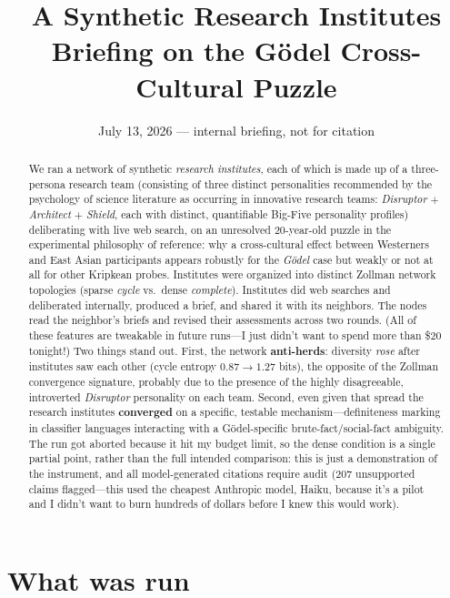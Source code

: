 \documentclass[11pt]{article}
\title{\large\bfseries A Synthetic Research Institutes Briefing on the G\"odel Cross-Cultural Puzzle}
\date{\normalsize July 13, 2026 --- internal briefing, not for citation}
\begin{document}
\maketitle
\vspace{-1.6em}

\begin{abstract}
\noindent We ran a network of synthetic \emph{research institutes}, each of which is made up of a three-persona  research team (consisting of three distinct personalities recommended by the psychology of science literature as occurring in innovative research teams: \emph{Disruptor} $+$ \emph{Architect} $+$ \emph{Shield}, each with distinct, quantifiable Big-Five personality profiles) deliberating with live web search, on an unresolved 20-year-old puzzle in the experimental philosophy of reference: why a cross-cultural effect between Westerners and East Asian participants appears robustly for the \emph{G\"odel} case but weakly or not at all for other Kripkean probes. Institutes were organized into distinct Zollman network topologies (sparse \emph{cycle} vs.\ dense \emph{complete}). Institutes did web searches and deliberated internally, produced a brief, and shared it with its neighbors. The nodes read the neighbor's briefs and revised their assessments across two rounds. (All of these features are tweakable in future runs—I just didn't want to spend more than \$20 tonight!) Two things stand out. First, the network \textbf{anti-herds}: diversity \emph{rose} after institutes saw each other (cycle entropy $0.87 \to 1.27$ bits), the opposite of the Zollman convergence signature, probably due to the presence of the highly disagreeable, introverted \emph{Disruptor} personality on each team. Second, even given that spread the research institutes \textbf{converged} on a specific, testable mechanism---definiteness marking in classifier languages interacting with a G\"odel-specific brute-fact/social-fact ambiguity. The run got aborted because it hit my budget limit, so the dense condition is a single partial point, rather than the full intended comparison: this is just a demonstration of the instrument, and all model-generated citations require audit (207 unsupported claims flagged---this used the cheapest Anthropic model, Haiku, because it's a pilot and I didn't want to burn hundreds of dollars before I knew this would work).
\end{abstract}

\section{What was run}
\end{document}
